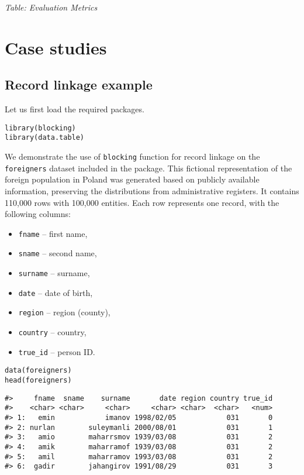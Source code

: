 \emph{Table: Evaluation Metrics}

\section{Case studies}\label{sec-case}

\subsection{Record linkage example}\label{record-linkage-example}

Let us first load the required packages.

\begin{verbatim}
library(blocking)
library(data.table)
\end{verbatim}

We demonstrate the use of \texttt{blocking} function for record linkage on the
\texttt{foreigners} dataset included in the package. This fictional
representation of the foreign population in Poland was generated based
on publicly available information, preserving the distributions from
administrative registers. It contains 110,000 rows with 100,000
entities. Each row represents one record, with the following columns:

\begin{itemize}
\tightlist
\item
  \texttt{fname} -- first name,
\item
  \texttt{sname} -- second name,
\item
  \texttt{surname} -- surname,
\item
  \texttt{date} -- date of birth,
\item
  \texttt{region} -- region (county),
\item
  \texttt{country} -- country,
\item
  \texttt{true\_id} -- person ID.
\end{itemize}

\begin{verbatim}
data(foreigners)
head(foreigners)
\end{verbatim}

\begin{verbatim}
#>     fname  sname    surname       date region country true_id
#>    <char> <char>     <char>     <char> <char>  <char>   <num>
#> 1:   emin            imanov 1998/02/05            031       0
#> 2: nurlan        suleymanli 2000/08/01            031       1
#> 3:   amio        maharrsmov 1939/03/08            031       2
#> 4:   amik        maharramof 1939/03/08            031       2
#> 5:   amil        maharramov 1993/03/08            031       2
#> 6:  gadir        jahangirov 1991/08/29            031       3
\end{verbatim}

